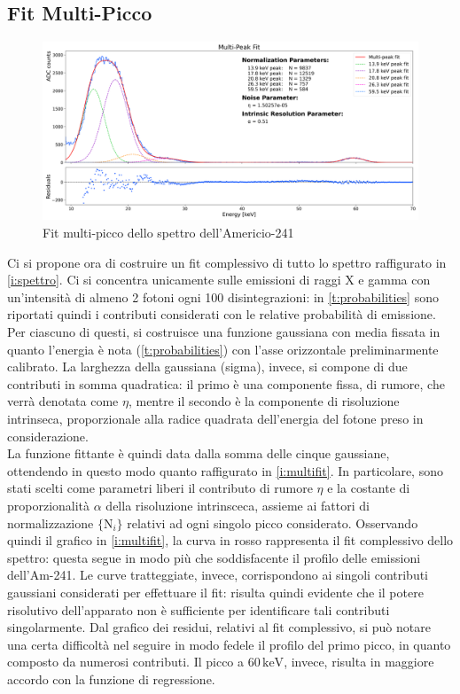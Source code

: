 \documentclass[twocolumn,10pt]{asme2ej}
\begin{document}
\subsection{Fit Multi-Picco}\label{s:multipicco}

\begin{figure}
    \centering
    \includegraphics[width=\textwidth]{../Plots/multifit.png}
   \caption{Fit multi-picco dello spettro dell'Americio-241}
    \label{i:multifit}
\end{figure}




Ci si propone ora di costruire un fit complessivo di tutto lo spettro raffigurato in \autoref{i:spettro}. Ci si
concentra unicamente sulle emissioni di raggi X e gamma con un'intensità di almeno 2 fotoni ogni 100 disintegrazioni: in
\autoref{t:probabilities} sono riportati quindi i contributi considerati con le relative probabilità di emissione. Per
ciascuno di questi, si costruisce una funzione gaussiana con media fissata in quanto l'energia è nota
(\autoref{t:probabilities}) con l'asse orizzontale preliminarmente calibrato. La larghezza della gaussiana
(sigma), invece, si compone di due contributi in somma quadratica: il primo è una componente fissa, di rumore, che verrà
denotata come $\eta$, mentre il secondo è la componente di risoluzione intrinseca, proporzionale alla radice
quadrata dell'energia del fotone preso in considerazione. \\
La funzione fittante è quindi data dalla somma delle cinque gaussiane, ottendendo in questo modo quanto raffigurato in \autoref{i:multifit}. In particolare, sono stati
scelti come parametri liberi il contributo di rumore $\eta$ e la costante di proporzionalità $\alpha$ della risoluzione intrinsceca, assieme ai fattori di
normalizzazione $\{\text{N}_i\}$ relativi ad ogni singolo picco considerato. Osservando quindi il grafico in
\autoref{i:multifit}, la curva in rosso rappresenta il fit complessivo dello spettro: questa segue in modo più che
soddisfacente il profilo delle emissioni dell'Am-241. Le curve tratteggiate, invece, corrispondono ai singoli contributi
gaussiani considerati per effettuare il fit: risulta quindi evidente che il potere risolutivo dell'apparato non è
sufficiente per identificare tali contributi singolarmente. Dal grafico dei residui, relativi al fit complessivo, si può
notare una certa difficoltà nel seguire in modo fedele il profilo del primo picco, in quanto composto da numerosi
contributi. Il picco a $60\,\si{\kilo\electronvolt}$, invece, risulta in maggiore accordo con la funzione di
regressione.
\end{document}
